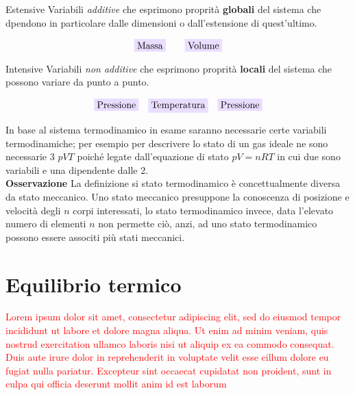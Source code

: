 \documentclass[x11names]{report}
\newcommand{\viola}[1]{\colorbox{yred}{$\displaystyle #1$}}
\begin{document}
\begin{center}
\begin{minipage}{0.49\textwidth}
	\begin{es}{Estensive}
		Variabili \textit{additive} che esprimono proprità \textbf{globali} del sistema che dpendono in particolare dalle dimensioni o dall'estensione di quest'ultimo.
		
		\[\viola{\text{Massa}} \qquad \viola{\text{Volume}}\]
		
	\end{es}
\end{minipage}
\begin{minipage}{0.49\textwidth}
	\begin{es}{Intensive}
	Variabili \textit{non additive} che esprimono proprità \textbf{locali} del sistema che possono variare da punto a punto.
	
	\[\viola{\text{Pressione}} \quad \viola{\text{Temperatura}}\quad \viola{\text{Pressione}}\]
	
	\end{es}
\end{minipage}
\end{center}
In base al sistema termodinamico in esame saranno necessarie certe variabili termodinamiche; per esempio per descrivere lo stato di un gas ideale ne sono necessarie 3 \(pVT\) poiché legate dall'equazione di stato \( pV = nRT\) in cui due sono variabili e una dipendente dalle 2.\\

\noindent
\textbf{Osservazione}  La definizione si stato termodinamico è concettualmente diversa da stato meccanico. Uno stato meccanico presuppone la conoscenza di posizione e velocità degli \(n\) corpi interessati, lo stato termodinamico invece, data l'elevato numero di elementi \(n\) non permette ciò, anzi, ad uno stato termodinamico possono essere associti più stati meccanici.

\section{Equilibrio termico}
\textcolor{red}{Lorem ipsum dolor sit amet, consectetur adipiscing elit, sed do eiusmod tempor incididunt ut labore et dolore magna aliqua. Ut enim ad minim veniam, quis nostrud exercitation ullamco laboris nisi ut aliquip ex ea commodo consequat. Duis aute irure dolor in reprehenderit in voluptate velit esse cillum dolore eu fugiat nulla pariatur. Excepteur sint occaecat cupidatat non proident, sunt in culpa qui officia deserunt mollit anim id est laborum}\\
\end{document}
